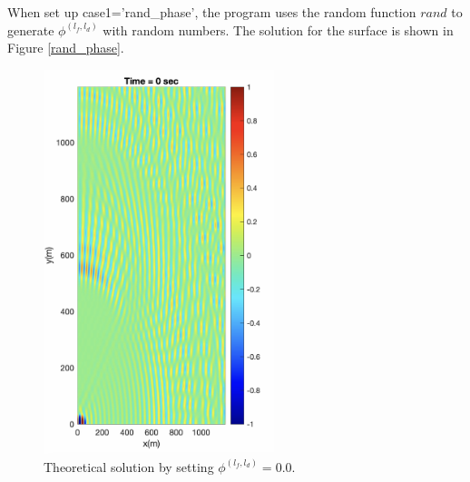 \documentclass[preprint,10pt]{elsarticle}
\begin{document}
 When set up case1='rand\_phase', the program uses the random function $rand$ to generate $\phi^{(l_f,l_d)}$ with random numbers. The solution for the surface is shown in Figure \ref{rand_phase}. 
  \begin{figure}
\begin{center}
 \includegraphics[width=0.6\textwidth]{figures/zero_phase.png}
 \caption{Theoretical solution by setting  $\phi^{(l_f,l_d)} = 0.0$.}
 \label{zero_phase}
 \end{center}
 \end{figure}
\end{document}
